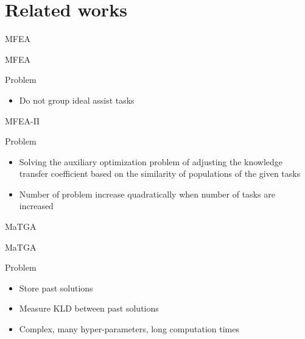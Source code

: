 \section{Related works}

\begin{frame}{MFEA}
    \begin{block}{MFEA}
    \end{block}
    \begin{block}{Problem}
        \begin{itemize}
            \item Do not group ideal assist tasks
        \end{itemize}
    \end{block}

    \begin{block}{MFEA-II}
    \end{block}
    \begin{block}{Problem}
        \begin{itemize}
            \item Solving the auxiliary optimization problem of adjusting the knowledge transfer coefficient based on the similarity of populations of the given tasks
            \item Number of problem increase quadratically when number of tasks are increased
        \end{itemize}
    \end{block}
\end{frame}

\begin{frame}{MaTGA}
    \begin{block}{MaTGA}
    \end{block}
    \begin{block}{Problem}
        \begin{itemize}
            \item Store past solutions
            \item Measure KLD between past solutions
            \item Complex, many hyper-parameters, long computation times
        \end{itemize}
    \end{block}
\end{frame}


